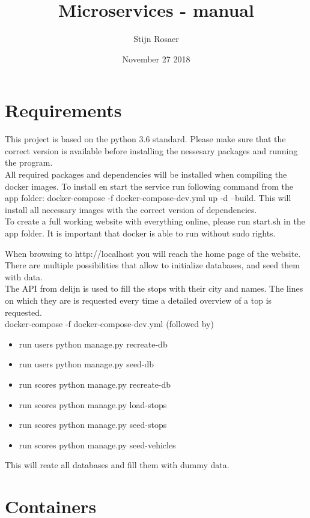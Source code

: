 \documentclass[12pt,a4paper]{article}
\author{Stijn Rosaer}
\title{Microservices - manual}
\date{November 27 2018}
\begin{document}
\maketitle
\section{Requirements}
This project is based on the python 3.6 standard. Please make sure that the correct version is available before installing the nessesary packages and running the program.\\

All required packages and dependencies will be installed when compiling the docker images. To install en start the service run following command from the app folder: docker-compose -f docker-compose-dev.yml up -d --build. This will install all necessary images with the correct version of dependencies.\\

To create a full working website with everything online, please run start.sh in the app folder. It is important that docker is able to run without sudo rights.

When browsing to http://localhost you will reach the home page of the website.\\

\pagebreak
There are multiple possibilities that allow to initialize databases, and seed them with data.\\
The API from delijn is used to fill the stops with their city and names. The lines on which they are is requested every time a detailed overview of a top is requested.\\

docker-compose -f docker-compose-dev.yml (followed by)
\begin{itemize}
\item run users python manage.py recreate-db
\item run users python manage.py seed-db
\item run scores python manage.py recreate-db
\item run scores python manage.py load-stops
\item run scores python manage.py seed-stops
\item run scores python manage.py seed-vehicles
\end{itemize}

This will reate all databases and fill them with dummy data.

\section{Containers}
\end{document}
